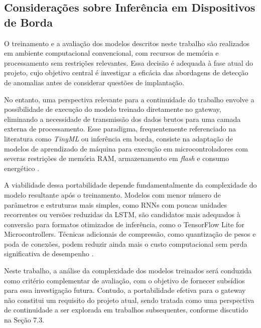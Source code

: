 
\subsection{Considerações sobre Inferência em Dispositivos de Borda}

O treinamento e a avaliação dos modelos descritos neste trabalho são 
realizados em ambiente computacional convencional, com recursos de memória e 
processamento sem restrições relevantes. Essa decisão é adequada à fase 
atual do projeto, cujo objetivo central é investigar a eficácia das 
abordagens de detecção de anomalias antes de considerar questões de 
implantação.

No entanto, uma perspectiva relevante para a continuidade do trabalho envolve 
a possibilidade de execução do modelo treinado diretamente no gateway, 
eliminando a necessidade de transmissão dos dados brutos para uma camada 
externa de processamento. Esse paradigma, frequentemente referenciado na 
literatura como \textit{TinyML} ou inferência em borda, consiste na adaptação 
de modelos de aprendizado de máquina para execução em microcontroladores com 
severas restrições de memória RAM, armazenamento em \textit{flash} e consumo 
energético \cite{ray2022}.

A viabilidade dessa portabilidade depende fundamentalmente da complexidade do 
modelo resultante após o treinamento. Modelos com menor número de parâmetros 
e estruturas mais simples, como RNNs com poucas unidades recorrentes ou 
versões reduzidas da LSTM, são candidatos mais adequados à conversão para 
formatos otimizados de inferência, como o TensorFlow Lite for 
Microcontrollers. Técnicas adicionais de compressão, como quantização de 
pesos e poda de conexões, podem reduzir ainda mais o custo computacional sem 
perda significativa de desempenho \cite{jacob2018}.

Neste trabalho, a análise da complexidade dos modelos treinados será 
conduzida como critério complementar de avaliação, com o objetivo de fornecer 
subsídios para essa investigação futura. Contudo, a portabilidade efetiva 
para o gateway não constitui um requisito do projeto atual, sendo tratada 
como uma perspectiva de continuidade a ser explorada em trabalhos 
subsequentes, conforme discutido na Seção 7.3.
